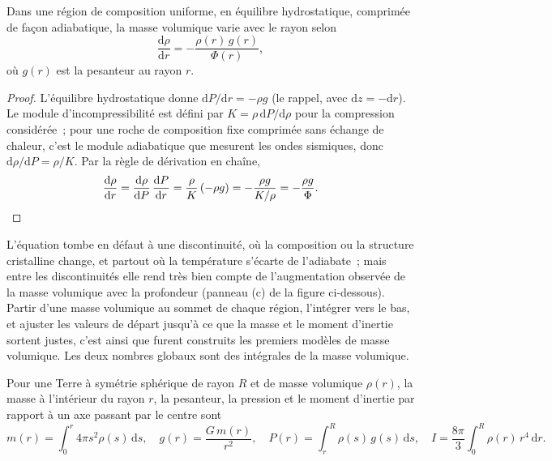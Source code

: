 \begin{theorem}\label{thm:b1:layered-earth:adams-williamson}
Dans une région de composition uniforme, en équilibre hydrostatique, comprimée de
façon adiabatique, la masse volumique varie avec le rayon selon
\[
  \frac{\mathrm d\rho}{\mathrm dr} = -\frac{\rho(r)\,g(r)}{\Phi(r)},
\]
où $g(r)$ est la pesanteur au rayon $r$.
\end{theorem}

\begin{proof}
L'équilibre hydrostatique donne $\mathrm dP/\mathrm dr = -\rho g$ (le rappel,
avec $\mathrm dz = -\mathrm dr$). Le module d'incompressibilité est défini par
$K = \rho\,\mathrm dP/\mathrm d\rho$ pour la compression considérée~; pour une
roche de composition fixe comprimée sans échange de chaleur, c'est le module
adiabatique que mesurent les ondes sismiques, donc
$\mathrm d\rho/\mathrm dP = \rho/K$.
Par la règle de dérivation en chaîne,
\[
  \frac{\mathrm d\rho}{\mathrm dr} = \frac{\mathrm d\rho}{\mathrm dP}\,
  \frac{\mathrm dP}{\mathrm dr} = \frac{\rho}{K}\,(-\rho g) = -\frac{\rho g}{K/\rho}
  = -\frac{\rho g}{\Phi}. \qedhere
\]
\end{proof}

L'équation tombe en défaut à une discontinuité, où la composition ou la structure
cristalline change, et partout où la température s'écarte de l'adiabate~; mais
entre les discontinuités elle rend très bien compte de l'augmentation observée de
la masse volumique avec la profondeur (panneau (c) de la figure ci-dessous).
Partir d'une masse volumique au sommet de chaque région, l'intégrer vers le bas,
et ajuster les valeurs de départ jusqu'à ce que la masse et le moment d'inertie
sortent justes, c'est ainsi que furent construits les premiers modèles de masse
volumique. Les deux nombres globaux sont des intégrales de la masse volumique.

\begin{proposition}
\label{prop:b1:layered-earth:integrals}
Pour une Terre à symétrie sphérique de rayon $R$ et de masse volumique $\rho(r)$,
la masse à l'intérieur du rayon $r$, la pesanteur, la pression et le moment
d'inertie par rapport à un axe passant par le centre sont
\[
  m(r) = \int_0^r 4\pi s^2\rho(s)\,\mathrm ds, \quad
  g(r) = \frac{G\,m(r)}{r^2}, \quad
  P(r) = \int_r^R \rho(s)\,g(s)\,\mathrm ds, \quad
  I = \frac{8\pi}{3}\int_0^R \rho(r)\,r^4\,\mathrm dr.
\]
\end{proposition}

